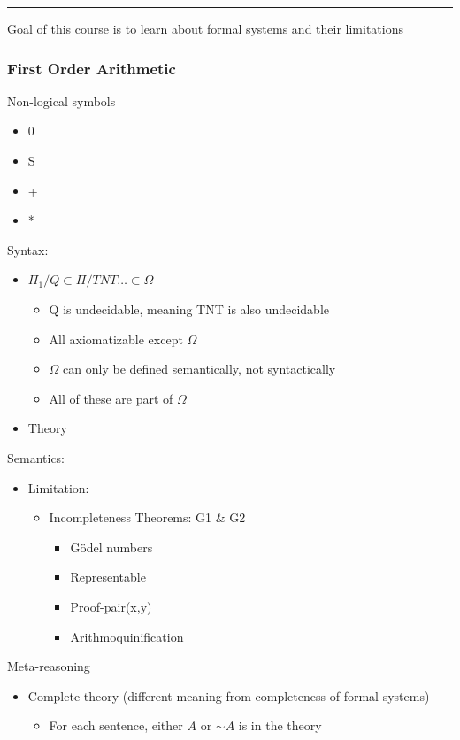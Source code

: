 \documentclass[11pt]{article}
\begin{document}
\noindent\rule{\textwidth}{0.5pt}
Goal of this course is to learn about formal systems and their limitations
\subsubsection{First Order Arithmetic}
\label{sec:orgacaa927}
Non-logical symbols
\begin{itemize}
\item 0
\item S
\item +
\item *
\end{itemize}
Syntax:
\begin{itemize}
\item \(\Pi_1/Q \subset \Pi/TNT \ldots \subset \Omega\)
\begin{itemize}
\item Q is undecidable, meaning TNT is also undecidable
\item All axiomatizable except \(\Omega\)
\item \(\Omega\) can only be defined semantically, not syntactically
\item All of these are part of \(\Omega\)
\end{itemize}
\item Theory
\end{itemize}
Semantics:
\begin{itemize}
\item Limitation:
\begin{itemize}
\item Incompleteness Theorems: G1 \& G2
\begin{itemize}
\item Gödel numbers
\item Representable
\item Proof-pair(x,y)
\item Arithmoquinification
\end{itemize}
\end{itemize}
\end{itemize}
Meta-reasoning
\begin{itemize}
\item Complete theory (different meaning from completeness of formal systems)
\begin{itemize}
\item For each sentence, either \(A\) or \(\sim A\) is in the theory
\end{itemize}
\end{itemize}
\end{document}

